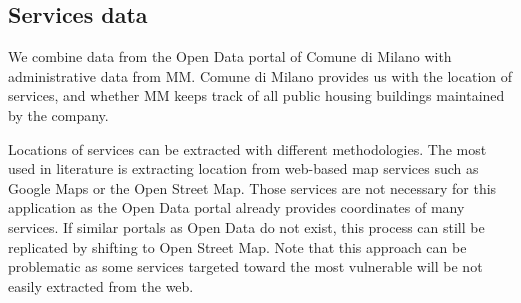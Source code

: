 \documentclass[12pt]{article}
\begin{document}
\subsection{Services data}
\label{service_data}

We combine data from the Open Data portal of Comune di Milano with administrative data from MM. Comune di Milano provides us with the location of services, and whether MM keeps track of all public housing buildings maintained by the company. 

Locations of services can be extracted with different methodologies. The most used in literature is extracting location from web-based map services such as Google Maps or the Open Street Map. Those services are not necessary for this application as the Open Data portal already provides coordinates of many services. If similar portals as Open Data do not exist, this process can still be replicated by shifting to Open Street Map. Note that this approach can be problematic as some services targeted toward the most vulnerable will be not easily extracted from the web.
\end{document}
